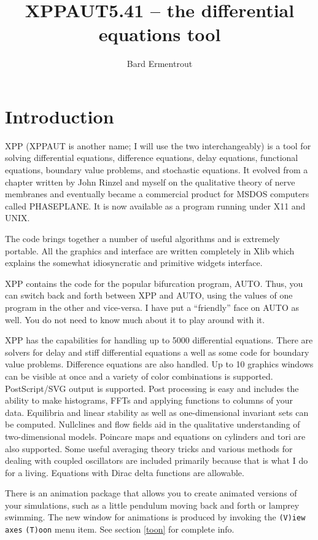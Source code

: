 \documentclass{article}
\title{XPPAUT5.41 -- the differential equations tool}
\author{Bard Ermentrout}
\begin{document}
\maketitle
\tableofcontents
\newpage
\section{Introduction} XPP (XPPAUT is another name; I will use the two
interchangeably)
  is a tool for solving differential
equations,
 difference 
equations, delay equations, functional equations, boundary value
problems, and stochastic equations. 
 It evolved 
from a chapter written by John Rinzel and myself on the qualitative
 theory of nerve membranes and eventually became a commercial product
 for MSDOS computers called PHASEPLANE.  It is now available as a
program running
 under
 X11 and UNIX.  

 The code 
brings together a number of useful algorithms and is extremely portable. 
 All the graphics and interface are written completely in Xlib which explains 
the somewhat idiosyncratic and primitive widgets interface.  

XPP contains the code for the popular bifurcation
program, AUTO.  Thus, you can switch back and forth between XPP and
AUTO, using the values of one program in the other and vice-versa.  I
have put a ``friendly'' face on AUTO as well.  You do not need to know
much about it to play around with it.

XPP has the capabilities for handling up to 5000 differential equations. 
 There are solvers for delay and stiff differential equations a well as
 some code for boundary value problems.  Difference equations are also
 handled.  Up to 10 graphics windows can be visible at once and a variety
 of color combinations is supported.  PostScript/SVG output
 is supported.  Post processing is easy and includes the ability to make
 histograms, FFTs and applying functions to columns of your data.
Equilibria
 and linear stability as well as one-dimensional invariant sets can be
 computed.  Nullclines and flow fields aid in the qualitative understanding
 of two-dimensional models.  Poincare maps and equations on cylinders and
 tori are also supported.  Some useful averaging theory tricks and various
 methods for dealing with coupled oscillators are included primarily because
 that is what I do for a living. Equations with Dirac delta functions
are allowable.

There is an animation package that allows you to
create animated versions of your simulations, such as a little
pendulum moving back and forth or lamprey swimming. The new window for
animations is produced by invoking the {\tt (V)iew axes} {\tt (T)oon}
menu item.  See section \ref{toon} for complete info.
\end{document}
